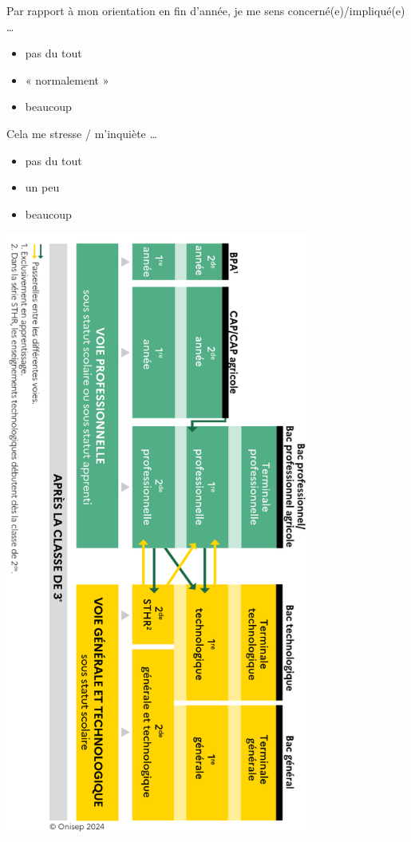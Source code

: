 \documentclass[11pt]{article}
\begin{document}
\vspace{10pt}
Par rapport à mon orientation en fin d'année, je me sens concerné(e)/impliqué(e) …
\begin{itemize}[label=\square, topsep=0pt]
\item pas du tout
\item « normalement »
\item beaucoup
\end{itemize}

\vspace{10pt}
Cela me stresse / m'inquiète …
\begin{itemize}[label=\square, topsep=0pt]
\item pas du tout
\item un peu
\item beaucoup
\end{itemize}

\newpage
\begin{center}
\includegraphics[width=0.75\textwidth]{images/orientation-apres-troisieme.png}
\end{center}
\end{document}
